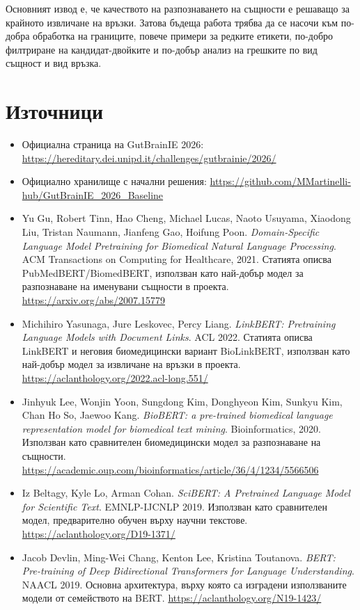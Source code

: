 \documentclass[12pt,a4paper]{article}
\begin{document}
Основният извод е, че качеството на разпознаването на същности е решаващо за крайното извличане на връзки. Затова бъдеща работа трябва да се насочи към по-добра обработка на границите, повече примери за редките етикети, по-добро филтриране на кандидат-двойките и по-добър анализ на грешките по вид същност и вид връзка.

\section*{Източници}

\begin{itemize}
\item Официална страница на GutBrainIE 2026: 
\url{https://hereditary.dei.unipd.it/challenges/gutbrainie/2026/}

\item Официално хранилище с начални решения: 
\url{https://github.com/MMartinelli-hub/GutBrainIE_2026_Baseline}

\item Yu Gu, Robert Tinn, Hao Cheng, Michael Lucas, Naoto Usuyama, Xiaodong Liu, Tristan Naumann, Jianfeng Gao, Hoifung Poon. 
\textit{Domain-Specific Language Model Pretraining for Biomedical Natural Language Processing}. 
ACM Transactions on Computing for Healthcare, 2021. 
Статията описва PubMedBERT/BiomedBERT, използван като най-добър модел за разпознаване на именувани същности в проекта. 
\url{https://arxiv.org/abs/2007.15779}

\item Michihiro Yasunaga, Jure Leskovec, Percy Liang. 
\textit{LinkBERT: Pretraining Language Models with Document Links}. 
ACL 2022. 
Статията описва LinkBERT и неговия биомедицински вариант BioLinkBERT, използван като най-добър модел за извличане на връзки в проекта. 
\url{https://aclanthology.org/2022.acl-long.551/}

\item Jinhyuk Lee, Wonjin Yoon, Sungdong Kim, Donghyeon Kim, Sunkyu Kim, Chan Ho So, Jaewoo Kang. 
\textit{BioBERT: a pre-trained biomedical language representation model for biomedical text mining}. 
Bioinformatics, 2020. 
Използван като сравнителен биомедицински модел за разпознаване на същности. 
\url{https://academic.oup.com/bioinformatics/article/36/4/1234/5566506}

\item Iz Beltagy, Kyle Lo, Arman Cohan. 
\textit{SciBERT: A Pretrained Language Model for Scientific Text}. 
EMNLP-IJCNLP 2019. 
Използван като сравнителен модел, предварително обучен върху научни текстове. 
\url{https://aclanthology.org/D19-1371/}

\item Jacob Devlin, Ming-Wei Chang, Kenton Lee, Kristina Toutanova. 
\textit{BERT: Pre-training of Deep Bidirectional Transformers for Language Understanding}. 
NAACL 2019. 
Основна архитектура, върху която са изградени използваните модели от семейството на BERT. 
\url{https://aclanthology.org/N19-1423/}
\end{itemize}
\end{document}
